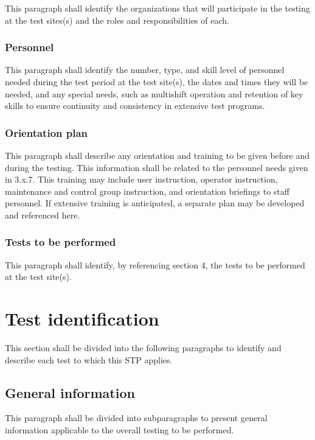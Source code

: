 This paragraph shall identify the organizations that will participate in
the testing at the test sites(s) and the roles and responsibilities of
each.

\subsubsection{Personnel}

This paragraph shall identify the number, type, and skill level of
personnel needed during the test period at the test site(s), the dates
and times they will be needed, and any special needs, such as multishift
operation and retention of key skills to ensure continuity and
consistency in extensive test programs.

\subsubsection{Orientation plan}

This paragraph shall describe any orientation and training to be given
before and during the testing. This information shall be related to the
personnel needs given in 3.x.7. This training may include user
instruction, operator instruction, maintenance and control group
instruction, and orientation briefings to staff personnel. If extensive
training is anticipated, a separate plan may be developed and referenced
here.

\subsubsection{Tests to be performed}

This paragraph shall identify, by referencing section 4, the tests to be
performed at the test site(s).

\section{Test identification}

This section shall be divided into the following paragraphs to identify
and describe each test to which this STP applies.

\subsection{General information}

This paragraph shall be divided into subparagraphs to present general
information applicable to the overall testing to be performed.

